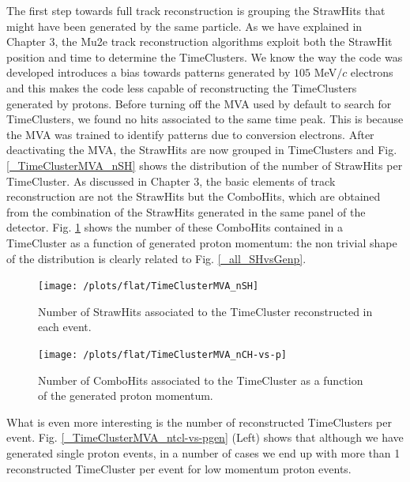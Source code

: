 \documentclass[12pt,a4paper,openright, oneside, titlepage]{book} %
\begin{document}
\noindent The first step towards full track reconstruction is grouping the StrawHits that might have been generated by the same particle. 
As we have explained in Chapter 3, the Mu2e track reconstruction algorithms exploit both the StrawHit position and time to determine the TimeClusters. 
We know the way the code was developed introduces a bias towards patterns generated by $105$ MeV$/c$ electrons and this makes the code less capable of reconstructing the TimeClusters generated by protons. 
Before turning off the MVA used by default to search for TimeClusters, we found no hits associated to the same time peak. 
This is because the MVA was trained to identify patterns due to conversion electrons. 
After deactivating the MVA, the StrawHits are now grouped in TimeClusters and Fig. \ref{_TimeClusterMVA_nSH} shows the distribution of the number of StrawHits per TimeCluster. 
As discussed in Chapter 3, the basic elements of track reconstruction are not the StrawHits but the ComboHits, which are obtained from the combination of the StrawHits generated in the same panel of the detector. 
Fig. \ref{_flat_TimeClusterMVA_nCH-vs-p} shows the number of these ComboHits contained in a TimeCluster as a function of generated proton momentum: the non trivial shape of the distribution is clearly related to Fig. \ref{_all_SHvsGenp}. 

\begin{figure}[!htb]
    \centering
    \begin{minipage}{.49\textwidth}
		\centering
		\texttt{[image: /plots/flat/TimeClusterMVA\_nSH]}
		\caption[Number of StrawHits associated to a TimeCluster]
		{Number of StrawHits associated to the TimeCluster reconstructed in each event.}
\label{_TimeClusterMVA_nSH}
	\end{minipage}
	\hfill
    \begin{minipage}{0.49\textwidth}
    	\centering
    	\texttt{[image: /plots/flat/TimeClusterMVA\_nCH-vs-p]}
\caption[Number of StrawHits associated to the TimeCluster per generated momentum]{Number of ComboHits associated to the TimeCluster as a function of the generated proton momentum.}
\label{_flat_TimeClusterMVA_nCH-vs-p}
    \end{minipage}
\end{figure}
    	
\noindent What is even more interesting is the number of reconstructed TimeClusters per event.  
Fig. \ref{_TimeClusterMVA_ntcl-vs-pgen} (Left) shows that although we have generated single proton events, in a number of cases we end up with more than 1 reconstructed TimeCluster per event for low momentum proton events.
\end{document}
